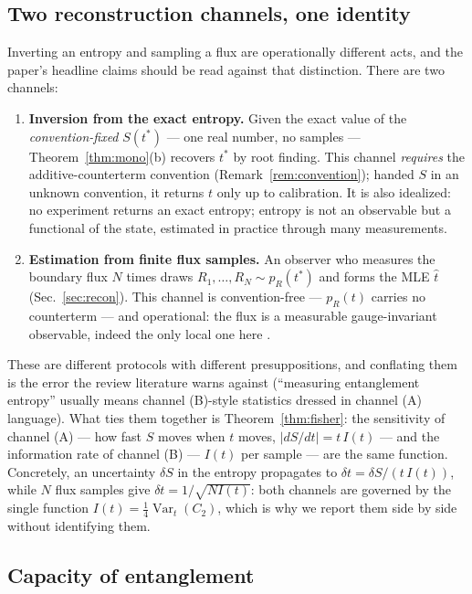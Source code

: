 \documentclass[11pt]{article}
\theoremstyle{remark}
\theoremstyle{plain}
\newcommand{\Var}{\operatorname{Var}}
\begin{document}
\subsection{Two reconstruction channels, one identity}\label{sec:channels}

Inverting an entropy and sampling a flux are operationally different acts, and the paper's headline claims should be read against that distinction. There are two channels:

\begin{enumerate}
\item[\textbf{(A)}] \textbf{Inversion from the exact entropy.} Given the exact value of the \emph{convention-fixed} $S(t^*)$ --- one real number, no samples --- Theorem~\ref{thm:mono}(b) recovers $t^*$ by root finding. This channel \emph{requires} the additive-counterterm convention (Remark~\ref{rem:convention}); handed $S$ in an unknown convention, it returns $t$ only up to calibration. It is also idealized: no experiment returns an exact entropy; entropy is not an observable but a functional of the state, estimated in practice through many measurements.
\item[\textbf{(B)}] \textbf{Estimation from finite flux samples.} An observer who measures the boundary flux $N$ times draws $R_1, \dots, R_N \sim p_R(t^*)$ and forms the MLE $\hat t$ (Sec.~\ref{sec:recon}). This channel is convention-free --- $p_R(t)$ carries no counterterm --- and operational: the flux is a measurable gauge-invariant observable, indeed the only local one here \cite{D14}.
\end{enumerate}

These are different protocols with different presuppositions, and conflating them is the error the review literature warns against (``measuring entanglement entropy'' usually means channel (B)-style statistics dressed in channel (A) language). What ties them together is Theorem~\ref{thm:fisher}: the sensitivity of channel (A) --- how fast $S$ moves when $t$ moves, $|dS/dt| = t\,I(t)$ --- and the information rate of channel (B) --- $I(t)$ per sample --- are the same function. Concretely, an uncertainty $\delta S$ in the entropy propagates to $\delta t = \delta S / (t\,I(t))$, while $N$ flux samples give $\delta t = 1/\sqrt{N I(t)}$: both channels are governed by the single function $I(t) = \tfrac14\Var_t(C_2)$, which is why we report them side by side without identifying them.

\subsection{Capacity of entanglement}\label{sec:capacity}
\end{document}
